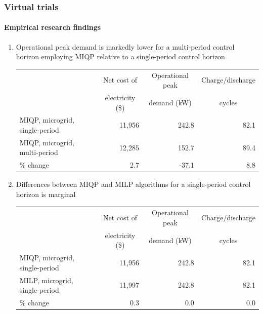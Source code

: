 \documentclass[presentation, smaller, xcolor=table]{beamer}
\newcounter{enumcount}
\begin{document}
\begin{frame}
	\frametitle{Virtual trials}
	\framesubtitle{Empirical research findings}

	\begin{enumerate}
		\setcounter{enumi}{\value{enumcount}}		
		\item  Operational peak demand is markedly lower for a multi-period control horizon employing MIQP relative to a single-period control horizon
			\begin{table}[!h]
			\centering
			{\scriptsize
			\begin{tabular}{l r r r}
				\toprule
				& \multicolumn{1}{c}{Net cost of}	& \multicolumn{1}{c}{Operational peak}	& \multicolumn{1}{c}{Charge/discharge}	\\
				& \multicolumn{1}{c}{	electricity (\$)} 	& \multicolumn{1}{c}{demand (kW)}		&\multicolumn{1}{c}{cycles}	\\
				\midrule
				MIQP, microgrid, single-period		& 11,956	& 242.8	& 82.1	\\
				MIQP, microgrid, multi-period		& 12,285	& 152.7	& 89.4	\\
				\midrule
				\% change	& 2.7		& -37.1	& 8.8		\\
				\bottomrule
			\end{tabular}
			}
			\end{table}
		
		\item  Differences between MIQP and MILP algorithms for a single-period control horizon is marginal
			\begin{table}
			\centering
			{\scriptsize
			\begin{tabular}{l r r r}
				\toprule
				& \multicolumn{1}{c}{Net cost of}	& \multicolumn{1}{c}{Operational peak}	& \multicolumn{1}{c}{Charge/discharge}	\\
				& \multicolumn{1}{c}{	electricity (\$)} 	& \multicolumn{1}{c}{demand (kW)}		&\multicolumn{1}{c}{cycles}	\\
				\midrule
				MIQP, microgrid, single-period		& 11,956	& 242.8	& 82.1	\\
				MILP, microgrid, single-period		& 11,997	& 242.8	& 82.1	\\
				\midrule
				\% change	& 0.3		& 0.0		& 0.0		\\
				\bottomrule
			\end{tabular}
			}
			\end{table}
		
		\setcounter{enumcount}{\value{enumi}}	
	\end{enumerate}

\end{frame}
\end{document}
